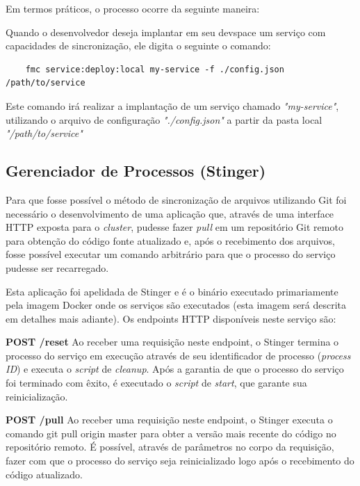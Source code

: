 	Em termos práticos, o processo ocorre da seguinte maneira:
	
	Quando o desenvolvedor deseja implantar em seu devspace um serviço com capacidades de sincronização, ele digita o seguinte o comando:

	\begin{verbatim}
	fmc service:deploy:local my-service -f ./config.json /path/to/service
	\end{verbatim}

	Este comando irá realizar a implantação de um serviço chamado \textit{"my-service"}, utilizando o arquivo de configuração \textit{"./config.json"} a partir da pasta local \textit{"/path/to/service"}

	\subsection{Gerenciador de Processos (Stinger)}	
	
	Para que fosse possível o método de sincronização de arquivos utilizando Git foi necessário o desenvolvimento de uma aplicação que, através de uma interface HTTP exposta para o \textit{cluster}, pudesse fazer \textit{pull} em um repositório Git remoto para obtenção do código fonte atualizado e, após o recebimento dos arquivos, fosse possível executar um comando arbitrário para que o processo do serviço pudesse ser recarregado.
	
	Esta aplicação foi apelidada de Stinger e é o binário executado primariamente pela imagem Docker onde os serviços são executados (esta imagem será descrita em detalhes mais adiante). Os endpoints HTTP disponíveis neste serviço são:

    \textbf{POST /reset}
	\newline
	Ao receber uma requisição neste endpoint, o Stinger termina o processo do serviço em execução através de seu identificador de processo (\textit{process ID}) e executa o \textit{script} de \textit{cleanup}. Após a garantia de que o processo do serviço foi terminado com êxito, é executado o \textit{script} de \textit{start}, que garante sua reinicialização.
	
	\textbf{POST /pull}
	\newline
	Ao receber uma requisição neste endpoint, o Stinger executa o comando git pull origin master para obter a versão mais recente do código no repositório remoto. É possível, através de parâmetros no corpo da requisição, fazer com que o processo do serviço seja reinicializado logo após o recebimento do código atualizado.

